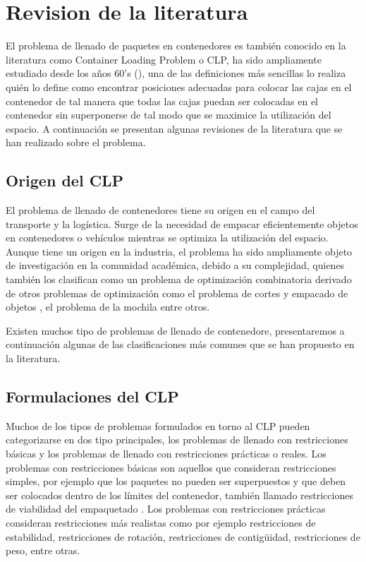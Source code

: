 
\section{Revision de la literatura}

El problema de llenado de paquetes en contenedores es también conocido en la literatura como Container Loading Problem o CLP, ha sido ampliamente estudiado desde los años 60's (\textcite{barnett1967exact}), una de las definiciones más sencillas lo realiza \textcite{GEORGE1980147} quién lo define como encontrar posiciones adecuadas para colocar las cajas en el contenedor de tal manera que todas las cajas puedan ser colocadas en el contenedor sin superponerse de tal modo que se maximice la utilización del espacio. A continuación se presentan algunas revisiones de la literatura que se han realizado sobre el problema.

\subsection{Origen del CLP}

El problema de llenado de contenedores tiene su origen en el campo del transporte y la logística. Surge de la necesidad de empacar eficientemente objetos en contenedores o vehículos mientras se optimiza la utilización del espacio. Aunque tiene un origen en la industria, el problema ha sido ampliamente objeto de investigación en la comunidad académica, debido a su complejidad, quienes también los clasifican como un problema de optimización combinatoria derivado de otros problemas de optimización como el problema de cortes y empacado de objetos \textcite{Alvarez-Valdes2018}, el problema de la mochila \textcite{DEQUEIROZ2012200} entre otros.

Existen muchos tipo de problemas de llenado de contenedore, presentaremos a continuación algunas de las clasificaciones más comunes que se han propuesto en la literatura.

\subsection{Formulaciones del CLP}

Muchos de los tipos de problemas formulados en torno al CLP pueden categorizarse en dos tipo principales, los problemas de llenado con restricciones básicas y los problemas de llenado con restricciones prácticas o reales. Los problemas con restricciones básicas son aquellos que consideran restricciones simples, por ejemplo que los paquetes no pueden ser superpuestos y que deben ser colocados dentro de los límites del contenedor, también llamado restricciones de viabilidad del empaquetado \textcite{scheithauer2017introduction}. Los problemas con restricciones prácticas consideran restricciones más realistas como por ejemplo restricciones de estabilidad, restricciones de rotación, restricciones de contigüidad, restricciones de peso, entre otras.

